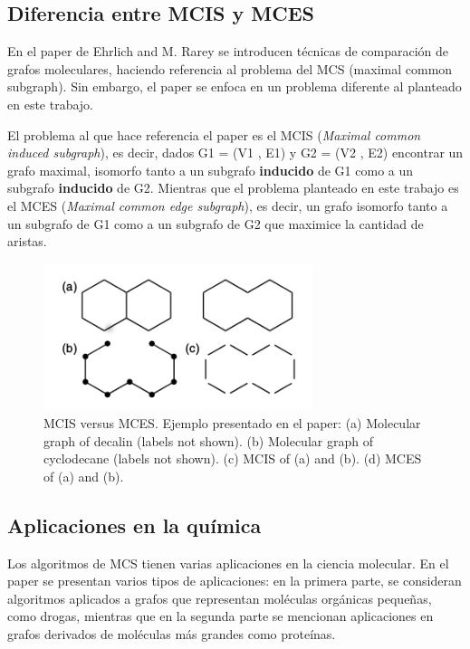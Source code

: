 \subsection{Diferencia entre MCIS y MCES}

En el paper de Ehrlich and M. Rarey se introducen técnicas de comparación de grafos moleculares, haciendo referencia al problema del MCS (maximal common subgraph). Sin embargo, el paper se enfoca en un problema diferente al planteado en este trabajo.

El problema al que hace referencia el paper es el MCIS (\textit{Maximal common induced subgraph}), es decir, dados G1 = (V1 , E1) y G2 = (V2 , E2) encontrar un grafo maximal, isomorfo tanto a un subgrafo \textbf{inducido} de G1 como a un subgrafo \textbf{inducido} de G2. Mientras que el problema planteado en este trabajo es el MCES (\textit{Maximal common edge subgraph}), es decir, un grafo isomorfo tanto a un subgrafo de G1 como a un subgrafo de G2 que maximice la cantidad de aristas.

\begin{figure}[H]
 \centering
	\includegraphics[width=0.7\textwidth]{img/problema1.png}
	\caption{MCIS versus MCES. Ejemplo presentado en el paper: (a) Molecular graph of
decalin (labels not shown). (b) Molecular graph of cyclodecane (labels
not shown). (c) MCIS of (a) and (b). (d) MCES of (a) and (b).}
	\label{fig:problema1-1}
\end{figure}

\subsection{Aplicaciones en la química}

Los algoritmos de MCS tienen varias aplicaciones en la ciencia molecular. En el paper se presentan varios tipos de aplicaciones: en la primera parte, se consideran algoritmos aplicados a grafos que representan moléculas orgánicas pequeñas, como drogas, mientras que en la segunda parte se mencionan aplicaciones en grafos derivados de moléculas más grandes como proteínas.

